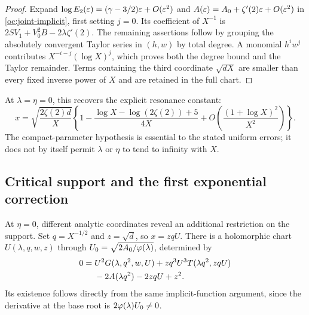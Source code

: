 \begin{proof}
Expand $\log E_2(\varepsilon)=(\gamma-3/2)\varepsilon+O(\varepsilon^2)$ and
$A(\varepsilon)=A_0+\zeta'(2)\varepsilon+O(\varepsilon^2)$ in
\eqref{oc:joint-implicit}, first setting $j=0$. Its coefficient
of $X^{-1}$ is $2SV_1+V_0^2B-2\lambda\zeta'(2)$.
The remaining assertions follow by grouping the absolutely
convergent Taylor series in $(h,w)$ by total degree. A monomial
$h^i w^j$ contributes $X^{-i-j}(\log X)^j$, which proves both
the degree bound and the Taylor remainder. Terms containing the
third coordinate $\sqrt{dX}$ are smaller than every fixed inverse
power of $X$ and are retained in the full chart.
\end{proof}

At $\lambda=\eta=0$, this recovers the explicit resonance constant:
\begin{equation}\label{oc:critical-first}
 x=\sqrt{\frac{2\zeta(2)d}{X}}
 \left\{1-\frac{\log X-\log(2\zeta(2))+5}{4X}
       +O\left(\frac{(1+\log X)^2}{X^2}\right)\right\}.
\end{equation}
The compact-parameter hypothesis is essential to the stated
uniform errors; it does not by itself permit $\lambda$ or $\eta$
to tend to infinity with $X$.

\subsection{Critical support and the first exponential correction}

At $\eta=0$, different analytic coordinates reveal an additional
restriction on the support. Set $q=X^{-1/2}$ and $z=\sqrt d$, so
$x=zqU$. There is a holomorphic chart $U(\lambda,q,w,z)$ through
$U_0=\sqrt{2A_0/\varphi(\lambda)}$, determined by
\begin{align}
 0={}&U^2G(\lambda,q^2,w,U)
       +zq^3U^3T(\lambda q^2,zqU)\notag\\
    &-2A(\lambda q^2)-2zqU+z^2.
       \label{oc:critical-implicit}
\end{align}
Its existence follows directly from the same implicit-function
argument, since the derivative at the base root is
$2\varphi(\lambda)U_0\ne0$.

